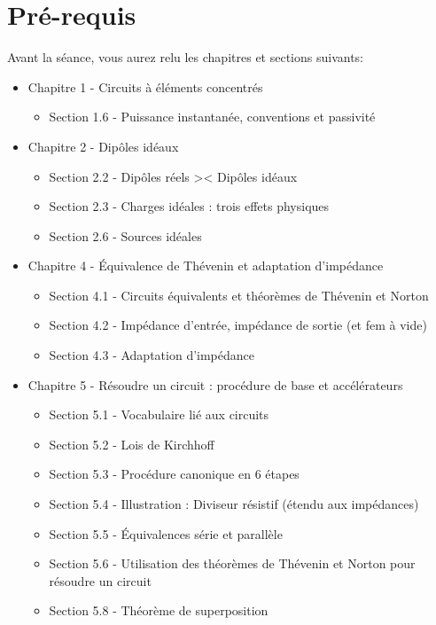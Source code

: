\section{Pré-requis}
Avant la séance, vous aurez relu les chapitres et sections suivants:
\begin{itemize}
	\item Chapitre 1 - Circuits à éléments concentrés
		\begin{itemize}
		\item Section 1.6 - Puissance instantanée, conventions et passivité
		\end{itemize}
	\item Chapitre 2 - Dipôles idéaux
	    \begin{itemize}
	        \item Section 2.2 - Dipôles réels >< Dipôles idéaux
	        \item Section 2.3 - Charges idéales : trois effets physiques
	        \item Section 2.6 - Sources idéales
	    \end{itemize}
	\item Chapitre 4 - Équivalence de Thévenin et adaptation d'impédance
		\begin{itemize}
		\item Section 4.1 - Circuits équivalents et théorèmes de Thévenin et Norton
		\item Section 4.2 - Impédance d'entrée, impédance de sortie (et fem à vide)
		\item Section 4.3 - Adaptation d'impédance
		\end{itemize}
	\item Chapitre 5 - Résoudre un circuit : procédure de base et accélérateurs
	    \begin{itemize}
	        \item Section 5.1 - Vocabulaire lié aux circuits 
	        \item Section 5.2 - Lois de Kirchhoff
	        \item Section 5.3 - Procédure canonique en 6 étapes
	        \item Section 5.4 - Illustration : Diviseur résistif (étendu aux impédances)
	        \item Section 5.5 - Équivalences série et parallèle
	        \item Section 5.6 - Utilisation des théorèmes de Thévenin et Norton pour résoudre un circuit
	        \item Section 5.8 - Théorème de superposition
	    \end{itemize}

\end{itemize}
